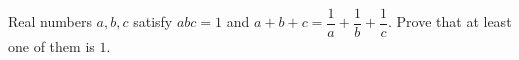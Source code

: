 Real numbers $a,b,c$ satisfy $abc=1$ and $a+b+c=\dfrac{1}{a}+\dfrac{1}{b}+\dfrac{1}{c}$. Prove that at least one of them is $1$.
